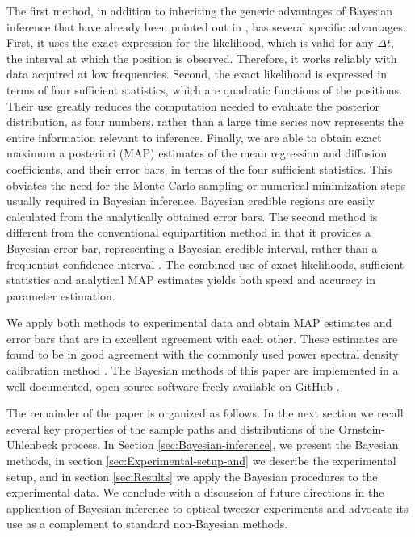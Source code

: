 \documentclass[english,aps, twocolumn, pre,superscriptaddress]{revtex4-1}
\begin{document}
The first method, in addition to inheriting the generic advantages
of Bayesian inference that have already been pointed out in \cite{richly2013calibrating},
has several specific advantages. First, it uses the exact expression
for the likelihood, which is valid for any $\Delta t$, the interval
at which the position is observed. Therefore, it works reliably with
data acquired at low frequencies. Second, the exact likelihood is
expressed in terms of four sufficient statistics, which are quadratic
functions of the positions. Their use greatly reduces the computation
needed to evaluate the posterior distribution, as four numbers, rather
than a large time series now represents the entire information relevant
to inference. Finally, we are able to obtain exact maximum a posteriori
(MAP) estimates of the mean regression and diffusion coefficients,
and their error bars, in terms of the four sufficient statistics.
This obviates the need for the Monte Carlo sampling or numerical minimization
steps usually required in Bayesian inference. Bayesian credible regions
are easily calculated from the analytically obtained error bars. The
second method is different from the conventional equipartition method
in that it provides a Bayesian error bar, representing a Bayesian
credible interval, rather than a frequentist confidence interval \cite{jaynes1976confidence}.
The combined use of exact likelihoods, sufficient statistics and analytical
MAP estimates yields both speed and accuracy in parameter estimation.

We apply both methods to experimental data and obtain MAP estimates
and error bars that are in excellent agreement with each other. These
estimates are found to be in good agreement with the commonly used
power spectral density calibration method \cite{berg2004power}. The
Bayesian methods of this paper are implemented in a well-documented,
open-source software freely available on GitHub \cite{pybisp}.

The remainder of the paper is organized as follows. In the next section
we recall several key properties of the sample paths and distributions
of the Ornstein-Uhlenbeck process. In Section \ref{sec:Bayesian-inference},
we present the Bayesian methods, in section \ref{sec:Experimental-setup-and}
we describe the experimental setup, and in section \ref{sec:Results}
we apply the Bayesian procedures to the experimental data. We conclude
with a discussion of future directions in the application of Bayesian
inference to optical tweezer experiments and advocate its use as a
complement to standard non-Bayesian methods.
\end{document}
